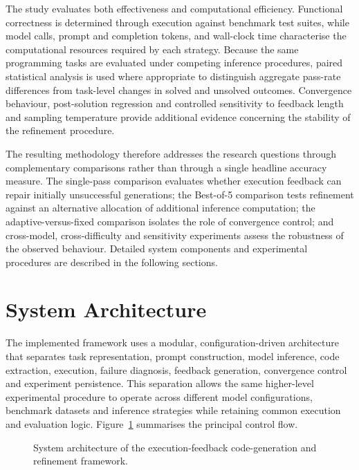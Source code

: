 The study evaluates both effectiveness and computational efficiency. Functional correctness is determined through execution against benchmark test suites, while model calls, prompt and completion tokens, and wall-clock time characterise the computational resources required by each strategy. Because the same programming tasks are evaluated under competing inference procedures, paired statistical analysis is used where appropriate to distinguish aggregate pass-rate differences from task-level changes in solved and unsolved outcomes. Convergence behaviour, post-solution regression and controlled sensitivity to feedback length and sampling temperature provide additional evidence concerning the stability of the refinement procedure.

The resulting methodology therefore addresses the research questions through complementary comparisons rather than through a single headline accuracy measure. The single-pass comparison evaluates whether execution feedback can repair initially unsuccessful generations; the Best-of-5 comparison tests refinement against an alternative allocation of additional inference computation; the adaptive-versus-fixed comparison isolates the role of convergence control; and cross-model, cross-difficulty and sensitivity experiments assess the robustness of the observed behaviour. Detailed system components and experimental procedures are described in the following sections.

\section{System Architecture}
\label{sec:system-architecture}

The implemented framework uses a modular, configuration-driven architecture that separates task representation, prompt construction, model inference, code extraction, execution, failure diagnosis, feedback generation, convergence control and experiment persistence. This separation allows the same higher-level experimental procedure to operate across different model configurations, benchmark datasets and inference strategies while retaining common execution and evaluation logic. Figure~\ref{fig:system-architecture} summarises the principal control flow.

\begin{figure}[htbp]
    \centering
    \caption{System architecture of the execution-feedback code-generation and refinement framework.}
    \label{fig:system-architecture}
\end{figure}


